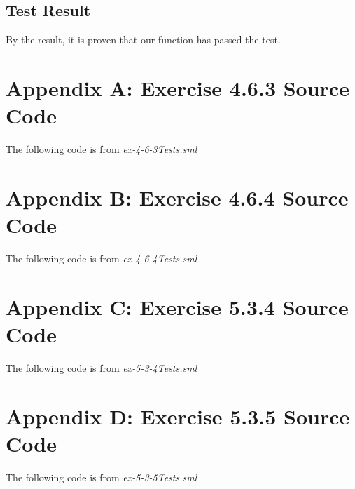 \documentclass{report}
\begin{document}
\section{Test Result}
\label{sec:test-result-3}

By the result, it is proven that our function has passed the test.

\chapter{Appendix A: Exercise 4.6.3 Source Code}
\label{cha:appendix-a:-exercise}
The following code is from \emph{ex-4-6-3Tests.sml}


\chapter{Appendix B: Exercise 4.6.4 Source Code}
\label{cha:appendix-b:-exercise}
The following code is from \emph{ex-4-6-4Tests.sml}


\chapter{Appendix C: Exercise 5.3.4 Source Code}
\label{cha:appendix-c:-exercise}
The following code is from \emph{ex-5-3-4Tests.sml}


\chapter{Appendix D: Exercise 5.3.5 Source Code}
\label{cha:appendix-d:-exercise}
The following code is from \emph{ex-5-3-5Tests.sml}

\end{document}
